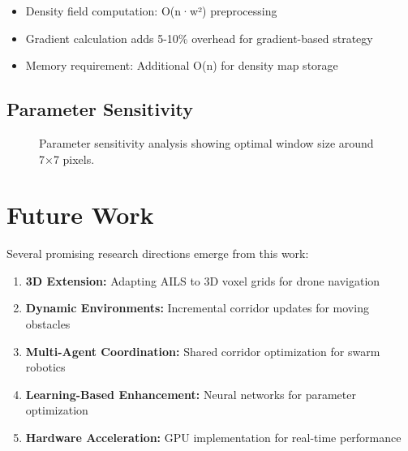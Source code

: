 \documentclass[journal]{IEEEtran}
\begin{document}
\begin{itemize}
\item Density field computation: O(n·w²) preprocessing
\item Gradient calculation adds 5-10\% overhead for gradient-based strategy
\item Memory requirement: Additional O(n) for density map storage
\end{itemize}

\subsection{Parameter Sensitivity}

\begin{figure}[h]
\centering
{}
\caption{Parameter sensitivity analysis showing optimal window size around 7×7 pixels.}
\label{fig:parameter_sensitivity}
\end{figure}

\section{Future Work}

Several promising research directions emerge from this work:

\begin{enumerate}
\item \textbf{3D Extension:} Adapting AILS to 3D voxel grids for drone navigation
\item \textbf{Dynamic Environments:} Incremental corridor updates for moving obstacles
\item \textbf{Multi-Agent Coordination:} Shared corridor optimization for swarm robotics
\item \textbf{Learning-Based Enhancement:} Neural networks for parameter optimization
\item \textbf{Hardware Acceleration:} GPU implementation for real-time performance
\end{enumerate}
\end{document}
